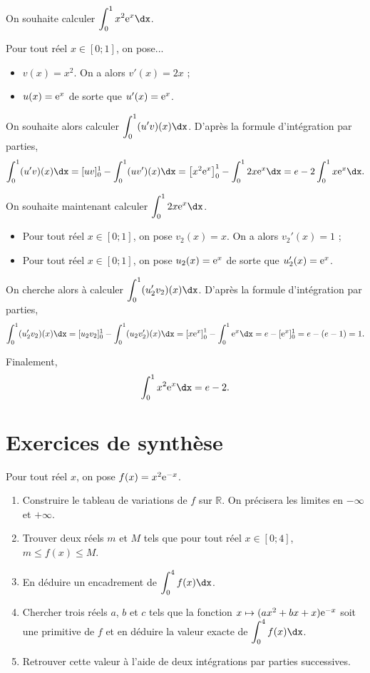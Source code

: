 \documentclass[11pt,fleqn, openany]{book} %
\begin{document}
\begin{solution}
On souhaite calculer \(\displaystyle\int_0^1x^2\e^x\dx\).

Pour tout réel \(x\in[0;1]\), on pose...
\begin{itemize}
\item  \(v(x)=x^2\). On a alors \(v'(x)=2x\) ;
\item  \(u(x)=\mathrm{e}^x\) de sorte que \(u'(x)=\mathrm{e}^x\).
\end{itemize}

On souhaite alors calculer \(\displaystyle\int_{0}^1 (u'v)(x)\dx\). D'après la formule d'intégration par parties,
\[ \displaystyle\int_{0}^1 (u'v)(x)\dx = [uv]_0^1 - \displaystyle\int_{0}^1 (uv')(x)\dx=\left[x^2\e^x\right]_0^1-\displaystyle\int_{0}^12x\e^x\dx=e-2\displaystyle\int_{0}^1x\e^x\dx.\]

On souhaite maintenant calculer \(\displaystyle\int_{0}^12x\e^x\dx\).

\begin{itemize}
\item  Pour tout réel \(x\in[0;1]\), on pose \(v_2(x)=x\). On a alors \(v_2'(x)=1\) ;
\item  Pour tout réel \(x\in[0;1]\), on pose \(u_2(x)=\mathrm{e}^x\) de sorte que \(u_2'(x)=\mathrm{e}^x\).
\end{itemize}

On cherche alors à calculer \(\displaystyle\int_{0}^1 (u_2'v_2)(x)\dx\). D'après la formule d'intégration par parties,
\[\displaystyle\int_{0}^1 (u_2'v_2)(x)\dx=[u_2v_2]_0^1-\displaystyle\int_{0}^1 (u_2v_2')(x)\dx = \left[x\e^x\right]_0^1-\displaystyle\int_{0}^1 \e^x \dx=e-[\e^x]_0^1=e-(e-1)=1 .\]

Finalement,
\[\displaystyle\int_0^1x^2\e^x\dx=e-2.\]\end{solution}





\section*{Exercices de synthèse}

\begin{exercise}Pour tout réel $x$, on pose $f(x)=x^2\mathrm{e}^{-x}$.
\begin{enumerate}
\item Construire le tableau de variations de $f$ sur $\mathbb{R}$. On précisera les limites en $-\infty$ et $+\infty$.
\item Trouver deux réels $m$ et $M$ tels que pour tout réel $x\in [0;4]$, $m \leqslant f(x) \leqslant M$.
\item En déduire un encadrement de $\displaystyle \int _0^4 f(x)\dx$.
\item Chercher trois réels $a$, $b$ et $c$ tels que la fonction $x\mapsto (ax^2+bx+x)\mathrm{e}^{-x}$ soit une primitive de $f$ et en déduire la valeur exacte de $\displaystyle \int _0^4 f(x)\dx$.
\item Retrouver cette valeur à l'aide de deux intégrations par parties successives.
\end{enumerate}\end{exercise}
\end{document}

